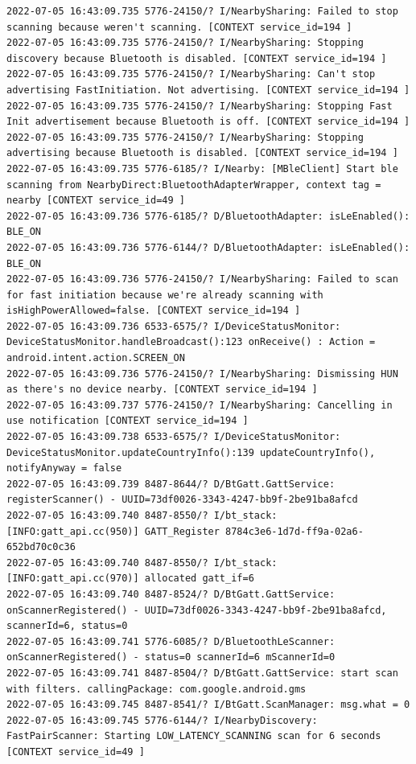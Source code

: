 \documentclass[a4paper,12pt]{book}
\begin{document}
\begin{lstlisting}
2022-07-05 16:43:09.735 5776-24150/? I/NearbySharing: Failed to stop scanning because weren't scanning. [CONTEXT service_id=194 ]
2022-07-05 16:43:09.735 5776-24150/? I/NearbySharing: Stopping discovery because Bluetooth is disabled. [CONTEXT service_id=194 ]
2022-07-05 16:43:09.735 5776-24150/? I/NearbySharing: Can't stop advertising FastInitiation. Not advertising. [CONTEXT service_id=194 ]
2022-07-05 16:43:09.735 5776-24150/? I/NearbySharing: Stopping Fast Init advertisement because Bluetooth is off. [CONTEXT service_id=194 ]
2022-07-05 16:43:09.735 5776-24150/? I/NearbySharing: Stopping advertising because Bluetooth is disabled. [CONTEXT service_id=194 ]
2022-07-05 16:43:09.735 5776-6185/? I/Nearby: [MBleClient] Start ble scanning from NearbyDirect:BluetoothAdapterWrapper, context tag = nearby [CONTEXT service_id=49 ]
2022-07-05 16:43:09.736 5776-6185/? D/BluetoothAdapter: isLeEnabled(): BLE_ON
2022-07-05 16:43:09.736 5776-6144/? D/BluetoothAdapter: isLeEnabled(): BLE_ON
2022-07-05 16:43:09.736 5776-24150/? I/NearbySharing: Failed to scan for fast initiation because we're already scanning with isHighPowerAllowed=false. [CONTEXT service_id=194 ]
2022-07-05 16:43:09.736 6533-6575/? I/DeviceStatusMonitor: DeviceStatusMonitor.handleBroadcast():123 onReceive() : Action = android.intent.action.SCREEN_ON
2022-07-05 16:43:09.736 5776-24150/? I/NearbySharing: Dismissing HUN as there's no device nearby. [CONTEXT service_id=194 ]
2022-07-05 16:43:09.737 5776-24150/? I/NearbySharing: Cancelling in use notification [CONTEXT service_id=194 ]
2022-07-05 16:43:09.738 6533-6575/? I/DeviceStatusMonitor: DeviceStatusMonitor.updateCountryInfo():139 updateCountryInfo(), notifyAnyway = false
2022-07-05 16:43:09.739 8487-8644/? D/BtGatt.GattService: registerScanner() - UUID=73df0026-3343-4247-bb9f-2be91ba8afcd
2022-07-05 16:43:09.740 8487-8550/? I/bt_stack: [INFO:gatt_api.cc(950)] GATT_Register 8784c3e6-1d7d-ff9a-02a6-652bd70c0c36
2022-07-05 16:43:09.740 8487-8550/? I/bt_stack: [INFO:gatt_api.cc(970)] allocated gatt_if=6
2022-07-05 16:43:09.740 8487-8524/? D/BtGatt.GattService: onScannerRegistered() - UUID=73df0026-3343-4247-bb9f-2be91ba8afcd, scannerId=6, status=0
2022-07-05 16:43:09.741 5776-6085/? D/BluetoothLeScanner: onScannerRegistered() - status=0 scannerId=6 mScannerId=0
2022-07-05 16:43:09.741 8487-8504/? D/BtGatt.GattService: start scan with filters. callingPackage: com.google.android.gms
2022-07-05 16:43:09.745 8487-8541/? I/BtGatt.ScanManager: msg.what = 0
2022-07-05 16:43:09.745 5776-6144/? I/NearbyDiscovery: FastPairScanner: Starting LOW_LATENCY_SCANNING scan for 6 seconds [CONTEXT service_id=49 ]

\end{lstlisting}
\end{document}
